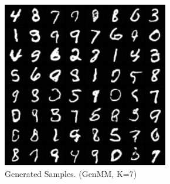 \begin{figure}[!t]
  \captionsetup[subfigure]{justification=centering}
  \centering
  \begin{subfigure}[b]{0.24\textwidth}
    \centering
    \includegraphics[width=1\linewidth]{images/mnist/samples/genMNIST_GenMM_K7_std089.png}
    \caption{Generated Samples. (GenMM, K=7)}
  \end{subfigure}
  \centering
  \begin{subfigure}[b]{0.24\textwidth}
    \centering

\end{subfigure}
\end{figure}

